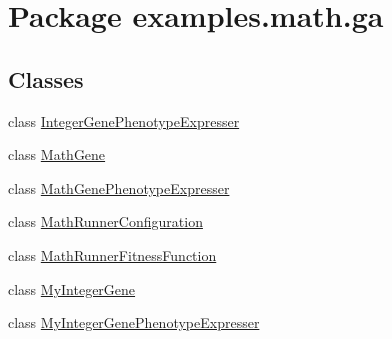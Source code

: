 \hypertarget{namespaceexamples_1_1math_1_1ga}{\section{Package examples.\-math.\-ga}
\label{namespaceexamples_1_1math_1_1ga}
}
\subsection*{Classes}
\begin{DoxyCompactItemize}
\item 
class \hyperlink{classexamples_1_1math_1_1ga_1_1_integer_gene_phenotype_expresser}{Integer\-Gene\-Phenotype\-Expresser}
\item 
class \hyperlink{classexamples_1_1math_1_1ga_1_1_math_gene}{Math\-Gene}
\item 
class \hyperlink{classexamples_1_1math_1_1ga_1_1_math_gene_phenotype_expresser}{Math\-Gene\-Phenotype\-Expresser}
\item 
class \hyperlink{classexamples_1_1math_1_1ga_1_1_math_runner_configuration}{Math\-Runner\-Configuration}
\item 
class \hyperlink{classexamples_1_1math_1_1ga_1_1_math_runner_fitness_function}{Math\-Runner\-Fitness\-Function}
\item 
class \hyperlink{classexamples_1_1math_1_1ga_1_1_my_integer_gene}{My\-Integer\-Gene}
\item 
class \hyperlink{classexamples_1_1math_1_1ga_1_1_my_integer_gene_phenotype_expresser}{My\-Integer\-Gene\-Phenotype\-Expresser}
\end{DoxyCompactItemize}
